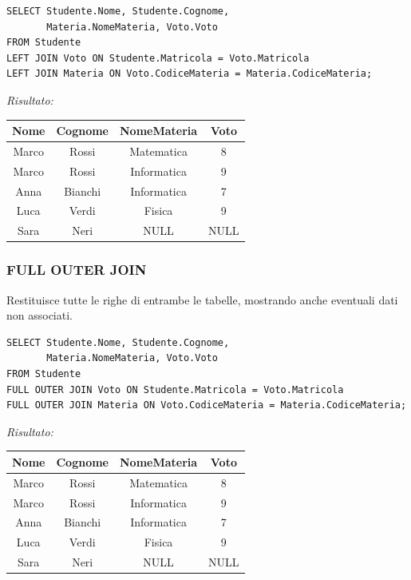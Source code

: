 \documentclass[a4paper,12pt]{article}
\begin{document}
\begin{verbatim}
SELECT Studente.Nome, Studente.Cognome,
       Materia.NomeMateria, Voto.Voto
FROM Studente
LEFT JOIN Voto ON Studente.Matricola = Voto.Matricola
LEFT JOIN Materia ON Voto.CodiceMateria = Materia.CodiceMateria;
\end{verbatim}

\textit{Risultato:}
\begin{center}
\begin{tabular}{|c|c|c|c|}
\hline
Nome & Cognome & NomeMateria & Voto \\
\hline
Marco & Rossi & Matematica & 8 \\
Marco & Rossi & Informatica & 9 \\
Anna & Bianchi & Informatica & 7 \\
Luca & Verdi & Fisica & 9 \\
Sara & Neri & NULL & NULL \\
\hline
\end{tabular}
\end{center}

\subsubsection{FULL OUTER JOIN}
Restituisce tutte le righe di entrambe le tabelle, mostrando anche eventuali dati non associati.

\begin{verbatim}
SELECT Studente.Nome, Studente.Cognome,
       Materia.NomeMateria, Voto.Voto
FROM Studente
FULL OUTER JOIN Voto ON Studente.Matricola = Voto.Matricola
FULL OUTER JOIN Materia ON Voto.CodiceMateria = Materia.CodiceMateria;
\end{verbatim}

\textit{Risultato:}
\begin{center}
\begin{tabular}{|c|c|c|c|}
\hline
Nome & Cognome & NomeMateria & Voto \\
\hline
Marco & Rossi & Matematica & 8 \\
Marco & Rossi & Informatica & 9 \\
Anna & Bianchi & Informatica & 7 \\
Luca & Verdi & Fisica & 9 \\
Sara & Neri & NULL & NULL \\
\hline
\end{tabular}
\end{center}
\end{document}
